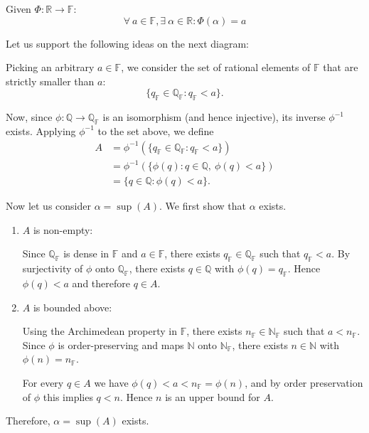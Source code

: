 \begin{lemma}\label{le:Phi-surjective}
Given $\Phi: \mathbb{R} \rightarrow \mathbb{F}$:
$$\forall \  a \in \mathbb{F},\exists \ \alpha \in \mathbb{R}: \Phi(\alpha) = a$$
\end{lemma}

\begin{bookproof}
Let us support the following ideas on the next diagram:


Picking an arbitrary $a \in \mathbb{F}$, we consider the set of rational elements of $\mathbb{F}$ that are strictly smaller than $a$:
$$
\{q_\mathbb{F} \in \mathbb{Q_F} : q_\mathbb{F} < a\}.
$$

Now, since $\phi : \mathbb{Q} \to \mathbb{Q_F}$ is an isomorphism (and hence injective), its inverse $\phi^{-1}$ exists. Applying $\phi^{-1}$ to the set above, we define
\begin{align*}
A
&= \phi^{-1}(\{q_\mathbb{F} \in \mathbb{Q_F} : q_\mathbb{F} < a\}) \\
&= \phi^{-1}(\{\phi(q) : q \in \mathbb{Q},\ \phi(q) < a\}) \\
&= \{q \in \mathbb{Q} : \phi(q) < a\}.
\end{align*}

Now let us consider $\alpha = \sup(A)$. We first show that $\alpha$ exists.

\begin{enumerate}
\item $A$ is non-empty:

Since $\mathbb{Q_F}$ is dense in $\mathbb{F}$ and $a \in \mathbb{F}$, there exists $q_\mathbb{F} \in \mathbb{Q_F}$ such that $q_\mathbb{F} < a$. By surjectivity of $\phi$ onto $\mathbb{Q_F}$, there exists $q \in \mathbb{Q}$ with $\phi(q) = q_\mathbb{F}$. Hence $\phi(q) < a$ and therefore $q \in A$.

\item $A$ is bounded above:

Using the Archimedean property in $\mathbb{F}$, there exists $n_\mathbb{F} \in \mathbb{N_F}$ such that $a < n_\mathbb{F}$. Since $\phi$ is order-preserving and maps $\mathbb{N}$ onto $\mathbb{N_F}$, there exists $n \in \mathbb{N}$ with $\phi(n) = n_\mathbb{F}$.  

For every $q \in A$ we have $\phi(q) < a < n_\mathbb{F} = \phi(n)$, and by order preservation of $\phi$ this implies $q < n$. Hence $n$ is an upper bound for $A$.
\end{enumerate}

Therefore, $\alpha = \sup(A)$ exists.
\end{bookproof}

